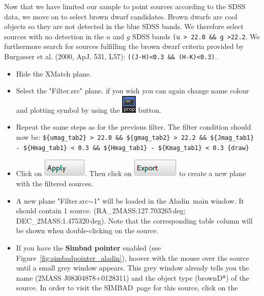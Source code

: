 \documentclass [a4paper, 12pt]{article}
\newcommand{\aladin}{{\textsc{A}{ladin}}}
\newcommand{\simbad}{{\textsc{SIMBAD}}}
\begin{document}
Now that we have limited our sample to point sources according to the 
SDSS data, we move on to select brown dwarf candidates. Brown dwarfs are 
cool objects so they are not detected in the blue SDSS bands. We therefore 
select sources with no detection in the $u$ and $g$ SDSS bands \texttt{(u > 
22.0 \&\& g >22.2}. We furthermore search for sources fulfilling the brown 
dwarf criteria provided by Burgasser et al. (2000, ApJ, 531, L57): 
\texttt{((J-H)<0.3 \&\& (H-K)<0.3)}.

\begin{itemize}
    \item Hide the XMatch plane.
    \item Select the "Filter.src" plane. if you wish you can again change name 
    colour and plotting symbol by using the \includegraphics[width=0.03 
    \textwidth]{../images/aladin_button_properties.png} button.
    \item Repeat the same steps as for the previous filter. The filter 
    condition should now be: \texttt{\$\{umag\_tab2\} > 22.0 \&\& 
    \$\{gmag\_tab2\} > 22.2 \&\& \$\{Jmag\_tab1\} - \$\{Hmag\_tab1\} < 0.3 \&\&
    \$\{Hmag\_tab1\} - \$\{Kmag\_tab1\} < 0.3 \{draw\}}
    \item Click on \includegraphics[width=0.1 
    \textwidth]{../images/aladin_filter_apply.png}. Then click on 
    \includegraphics[width=0.1 
    \textwidth]{../images/aladin_filter_export.png} to create a new plane with
    the filtered sources.
    \item A new plane "Filter.src$\sim$1" will be loaded in the \aladin\ main 
    window. It should contain 1 source. (RA\_2MASS:127.703265\,deg;
    DEC\_2MASS:1.475320\,deg). Note that the corresponding table column will be 
    shown when double-clicking on the source.
    \item If you have the \textbf{Simbad pointer} enabled (see 
    Figure~\ref{fig:simbadpointer_aladin}), hoover with the mouse over the 
    source until a small grey window appears. This grey window already tells 
    you the name (2MASS J08304878+0128311) and the object type (brownD*) of the 
    source. In order to visit the \simbad\ page for this source, click on the 

\end{itemize}
\end{document}
